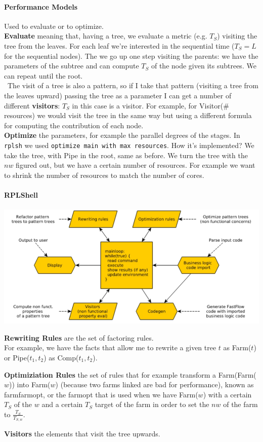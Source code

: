 \documentclass[10pt]{report}
\begin{document}
\paragraph{Performance Models} Used to evaluate or to optimize.\\
\textbf{Evaluate} meaning that, having a tree, we evaluate a metric (e.g. $T_S$) visiting the tree from the leaves. For each leaf we're interested in the sequential time ($T_S = L$ for the sequential nodes). The we go up one step visiting the parents: we have the parameters of the subtree and can compute $T_S$ of the node given its subtrees. We can repeat until the root.\\\
The visit of a tree is also a pattern, so if I take that pattern (visiting a tree from the leaves upward) passing the tree as a parameter I can get a number of different \textbf{visitors}: $T_S$ in this case is a visitor. For example, for Visitor(\# resources) we would visit the tree in the same way but using a different formula for computing the contribution of each node.\\
\textbf{Optimize} the parameters, for example the parallel degrees of the stages. In \texttt{rplsh} we used \texttt{optimize main with max resources}. How it's implemented? We take the tree, with Pipe in the root, same as before. We turn the tree with the $nw$ figured out, but we have a certain number of resources. For example we want to shrink the number of resources to match the number of cores.
\paragraph{RPLShell} \begin{center}
	\includegraphics[scale=0.5]{13.png}
\end{center}
\begin{list}{}{}
	\item \textbf{Rewriting Rules} are the set of factoring rules.\\
	For example, we have the facts that allow me to rewrite a given tree $t$ as Farm($t$) or Pipe($t_1,t_2$) as Comp($t_1,t_2$).
	\item \textbf{Optimiziation Rules} the set of rules that for example transform a Farm(Farm($w$)) into Farm($w$) (because two farms linked are bad for performance), known as farmfarmopt, or the farmopt that is used when we have Farm($w$) with a certain $T_S$ of the $w$ and a certain $T_S$ target of the farm in order to set the $nw$ of the farm to $\frac{T_S}{T_{S,w}}$.
	\item \textbf{Visitors} the elements that visit the tree upwards.
\end{list}
\end{document}
